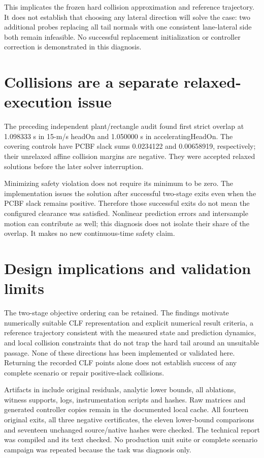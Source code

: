 \documentclass[11pt]{article}
\begin{document}
This implicates the frozen hard collision approximation and reference
trajectory. It does not establish that choosing any lateral direction will
solve the case: two additional probes replacing all tail normals with one
consistent lane-lateral side both remain infeasible. No successful replacement
initialization or controller correction is demonstrated in this diagnosis.

\section{Collisions are a separate relaxed-execution issue}
The preceding independent plant/rectangle audit found first strict overlap at
1.098333 s in 15-m/s headOn and 1.050000 s in acceleratingHeadOn. The covering
controls have PCBF slack sums 0.0234122 and 0.00658919, respectively; their
unrelaxed affine collision margins are negative. They were accepted relaxed
solutions before the later solver interruption.

Minimizing safety violation does not require its minimum to be zero. The
implementation issues the solution after successful two-stage exits even
when the PCBF slack remains positive. Therefore those successful exits do not
mean the configured clearance was satisfied. Nonlinear prediction errors and
intersample motion can contribute as well; this diagnosis does not isolate
their share of the overlap. It makes no new continuous-time safety claim.

\section{Design implications and validation limits}
The two-stage objective ordering can be retained. The findings motivate
numerically suitable CLF representation and explicit numerical result
criteria, a reference trajectory consistent with the measured state and
prediction dynamics, and local collision constraints that do not trap the
hard tail around an unsuitable passage. None of these directions has been
implemented or validated here. Returning the recorded CLF points alone does
not establish success of any complete scenario or repair positive-slack
collisions.

Artifacts in  include original
residuals, analytic lower bounds, all ablations, witness supports, logs,
instrumentation scripts and hashes. Raw matrices and generated controller
copies remain in the documented local cache. All fourteen original exits,
all three negative certificates, the eleven lower-bound comparisons and
seventeen unchanged source/native hashes were checked. The technical report
was compiled and its text checked. No production unit suite or complete
scenario campaign was repeated because the task was diagnosis only.
\end{document}
